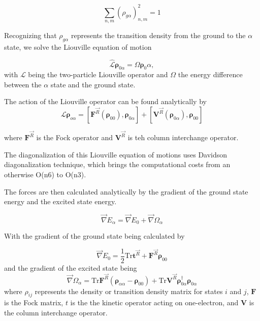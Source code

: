     \begin{equation}
	\sum_{n,m} (\rho_{g\alpha})^2_{n,m} = 1
    \end{equation}

    Recognizing that \(\rho_{g\alpha}\) represents the transition density from the ground to the \(\alpha\) state, we solve the Liouville equation of motion 

    \begin{equation}
	\hat{\mathcal{L}}\bm{\rho}_{0\alpha} = \Omega \bm{\rho}_0\alpha,
    \end{equation}
    with \(\mathcal{L}\) being the two-particle Liouville operator and \(\Omega\) the energy difference between the \(\alpha\) state and the ground state.

    The action of the Liouville operator can be found analytically by
    \begin{equation}
    \mathcal{L} \bm{\rho}_{o\alpha} = \left[ \bm{F}^{\vec{R}} (\bm{\rho}_{00}),\bm{\rho}_{0\alpha} \right] +
    \left[ \bm{V}^{\vec{R}} (\bm{\rho}_{0\alpha}), \bm{\rho}_{00} \right]
    \end{equation}

    where \(\bm{F}^{\vec{R}}\) is the Fock operator and \(\bm{V}^{\vec{R}}\) is teh column interchange operator.

    The diagonalization of this Liouville equation of motions uses Davidson diagonalization technique, which brings the computational costs from an otherwise O(n6) to O(n3). 

    The forces are then calculated analytically by the gradient of the ground state energy and the excited state energy. 

    \begin{equation}
    \vec{\nabla} E_\alpha = \vec{\nabla} E_0 + \vec{\nabla}\Omega_\alpha
    \end{equation}

    With the gradient of the ground state being calculated by

    \begin{equation}
    \vec{\nabla}E_0 = \frac{1}{2} \text{Tr} \bm{t}^{\vec{R}} + \bm{F}^{\vec{R}}\bm{\rho}_{00}
    \end{equation}
    and the gradient of the excited state being 
    \begin{equation}
    \vec{\nabla}\Omega_\alpha = \text{Tr} \bm{F}^{\vec{R}} \left( \bm{\rho}_{\alpha\alpha} - \bm{\rho}_{00} \right) + \text{Tr} \bm{V}^{\vec{R}} \bm{\rho}_{0\alpha}^\dagger \bm{\rho}_{0\alpha}
    \end{equation}
    where \(\rho_{ij}\) represents the density or transition density matrix for states \(i\) and \(j\),
    \(\bm{F}\) is the Fock matrix,
    \(t\) is the the kinetic operator acting on one-electron, and \(\bm{V}\) is the column interchange operator.

